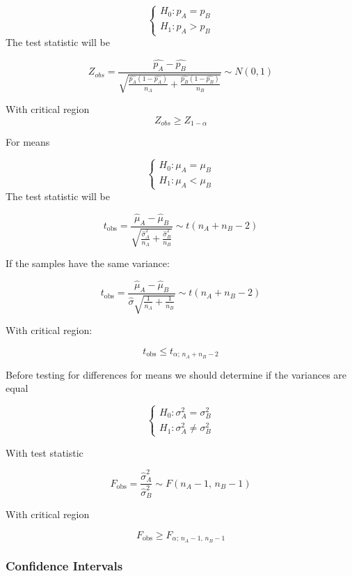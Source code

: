 \[
\begin{cases}
    H_0 : p_A = p_B \\[4pt]
    H_1 : p_A > p_B
\end{cases}
\]
The test statistic will be

\[
Z_{obs} = \frac{\hat{p_A}-\hat{p_B}}{\sqrt{\frac{\hat{p_A}(1-\hat{p_A})}{n_A}+\frac{\hat{p_B}(1-\hat{p_B})}{n_B}}} \sim N(0,1)
\]


With critical region 
\[
Z_{obs} \ge Z_{1-\alpha}
\]


\vspace{10pt}

For means

\[
\begin{cases}
    H_0 : \mu_A = \mu_B \\[4pt]
    H_1 : \mu_A < \mu_B
\end{cases}
\]
The test statistic will be

\[
t_{\text{obs}} = 
\frac{\hat{\mu}_A - \hat{\mu}_B}{
\sqrt{
\frac{\hat{\sigma}_A^2}{n_A} +
\frac{\hat{\sigma}_B^2}{n_B}
}
}
\sim t(n_A + n_B - 2)
\]

If the samples have the same variance:

\[
t_{\text{obs}} = 
\frac{\hat{\mu}_A - \hat{\mu}_B}{
\hat{\sigma}
\sqrt{
\frac{1}{n_A} + \frac{1}{n_B}
}
}
\sim t(n_A + n_B - 2)
\]

With critical region:

\[
t_{\text{obs}} \le t_{\alpha; \, n_A + n_B - 2}
\]


Before testing for differences for means we should determine if the variances are equal


\[
\begin{cases}
    H_0 : \sigma_A^2 = \sigma_B^2 \\[4pt]
    H_1 : \sigma_A^2 \neq \sigma_B^2
\end{cases}
\]

With test statistic 

\[
F_{\text{obs}} = 
\frac{\hat{\sigma}_A^2}{\hat{\sigma}_B^2}
\sim F(n_A - 1, \, n_B - 1)
\]

With critical region

\[
F_{\text{obs}} \ge F_{\alpha; \, n_A - 1, \, n_B - 1}
\]





\subsubsection{Confidence Intervals}

